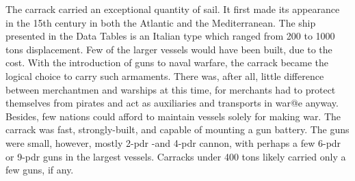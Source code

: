 \documentclass{article}
\begin{document}
\begin{multicols}{3}
The carrack carried an exceptional quantity of sail.  It first made
its appearance in the 15th century in both the Atlantic and the
Mediterranean.  The ship presented in the Data Tables is an Italian
type which ranged from 200 to 1000 tons displacement.  Few of the
larger vessels would have been built, due to the cost.  With the
introduction of guns to naval warfare, the carrack became the logical
choice to carry such armaments.  There was, after all, little
difference between merchantmen and warships at this time, for
merchants had to protect themselves from pirates and act as
auxiliaries and transports in war@e anyway.  Besides, few nations
could afford to maintain vessels solely for making war.  The carrack
was fast, strongly-built, and capable of mounting a gun battery.  The
guns were small, however, mostly 2-pdr -and 4-pdr cannon, with perhaps
a few 6-pdr or 9-pdr guns in the largest vessels.  Carracks under 400
tons likely carried only a few guns, if any.

\end{multicols}
\end{document}
